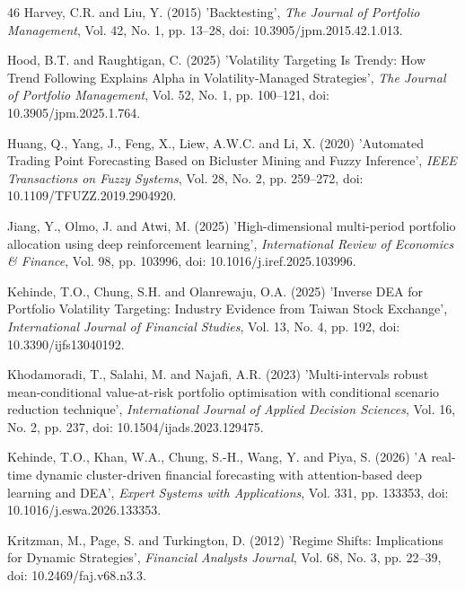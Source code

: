 \begin{thebibliography}{46}
Harvey, C.R. and Liu, Y. (2015) 'Backtesting', {\it The Journal of Portfolio Management}, Vol. 42, No. 1, pp. 13--28, doi: 10.3905/jpm.2015.42.1.013.

Hood, B.T. and Raughtigan, C. (2025) 'Volatility Targeting Is Trendy: How Trend Following Explains Alpha in Volatility-Managed Strategies', {\it The Journal of Portfolio Management}, Vol. 52, No. 1, pp. 100--121, doi: 10.3905/jpm.2025.1.764.

Huang, Q., Yang, J., Feng, X., Liew, A.W.C. and Li, X. (2020) 'Automated Trading Point Forecasting Based on Bicluster Mining and Fuzzy Inference', {\it IEEE Transactions on Fuzzy Systems}, Vol. 28, No. 2, pp. 259--272, doi: 10.1109/TFUZZ.2019.2904920.

Jiang, Y., Olmo, J. and Atwi, M. (2025) 'High-dimensional multi-period portfolio allocation using deep reinforcement learning', {\it International Review of Economics \& Finance}, Vol. 98, pp. 103996, doi: 10.1016/j.iref.2025.103996.

Kehinde, T.O., Chung, S.H. and Olanrewaju, O.A. (2025) 'Inverse DEA for Portfolio Volatility Targeting: Industry Evidence from Taiwan Stock Exchange', {\it International Journal of Financial Studies}, Vol. 13, No. 4, pp. 192, doi: 10.3390/ijfs13040192.

Khodamoradi, T., Salahi, M. and Najafi, A.R. (2023) 'Multi-intervals robust mean-conditional value-at-risk portfolio optimisation with conditional scenario reduction technique', {\it International Journal of Applied Decision Sciences}, Vol. 16, No. 2, pp. 237, doi: 10.1504/ijads.2023.129475.

Kehinde, T.O., Khan, W.A., Chung, S.-H., Wang, Y. and Piya, S. (2026) 'A real-time dynamic cluster-driven financial forecasting with attention-based deep learning and DEA', {\it Expert Systems with Applications}, Vol. 331, pp. 133353, doi: 10.1016/j.eswa.2026.133353.

Kritzman, M., Page, S. and Turkington, D. (2012) 'Regime Shifts: Implications for Dynamic Strategies', {\it Financial Analysts Journal}, Vol. 68, No. 3, pp. 22--39, doi: 10.2469/faj.v68.n3.3.


\end{thebibliography}
